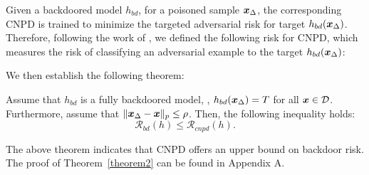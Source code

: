 Given a backdoored model $h_{bd}$, for a poisoned sample $\bm{x}_{\Delta}$, the corresponding CNPD is trained to minimize the targeted adversarial risk for target $h_{bd}(\bm{x}_{\Delta})$. Therefore, following the work of \cite{wei2023shared, wang2019improving}, we defined the following risk for CNPD, which measures the risk of classifying an adversarial example to the target $h_{bd}(\bm{x}_{\Delta})$:

\noindent{}

\noindent We then establish the following theorem:

\begin{thm}
Assume that $h_{bd}$ is a fully backdoored model, \ie, $h_{bd}(\bm{x}_{\Delta})=T$ for all $\bm{x}\in\mathcal{D}$. Furthermore, assume that $\|\bm{x}_{\Delta}-\bm{x}\|_p\leq \rho$. Then, the following inequality holds:
\begin{equation}
    \mathcal{R}_{bd}(h)\leq \mathcal{R}_{cnpd}(h).
\end{equation}
\label{theorem2}
\end{thm}

The above theorem indicates that CNPD offers an upper bound on backdoor risk. The proof of Theorem~\ref{theorem2} can be found in Appendix A. 


